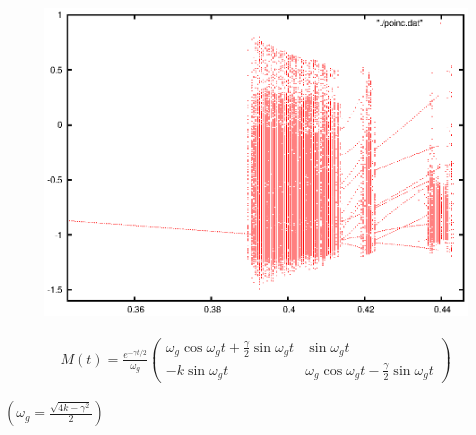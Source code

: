 \documentclass[xcolor=x11names,compress]{beamer}
\renewcommand{\(}{\begin{columns}}
\renewcommand{\)}{\end{columns}}
\newcommand{\<}[1]{\begin{column}{#1}}
\renewcommand{\>}{\end{column}}
\begin{document}
\begin{frame}
\begin{figure}
\caption{}
\begin{center}
\includegraphics[width=0.9\columnwidth]{poinc-bf-f}
\end{center}
\end{figure}
\end{frame}

\begin{frame}[label=homogen-evol]
\begin{eqnarray}
M(t)=\frac{e^{-\gamma t/2}}{\omega_g}
\begin{pmatrix}
\omega_g\cos{\omega_g t}+\frac{\gamma}{2}\sin{\omega_g t} & \sin{\omega_g t}\\
-k\sin{\omega_g t} & \omega_g\cos{\omega_g t}-\frac{\gamma}{2}\sin{\omega_g t}
\end{pmatrix}
\end{eqnarray}

$(\omega_g=\frac{\sqrt{4k-\gamma^2}}{2})$
\hyperlink{BackFromM}{}
\end{frame}
\end{document}

